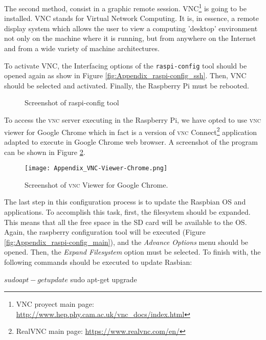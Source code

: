 The second method, consist in a graphic remote session. VNC\footnote{VNC proyect main page: \url{http://www.hep.phy.cam.ac.uk/vnc_docs/index.html}} is going to be installed. VNC stands for Virtual Network Computing. It is, in essence, a remote display system which allows the user to view a computing 'desktop' environment not only on the machine where it is running, but from anywhere on the Internet and from a wide variety of machine architectures. 

To activate VNC, the Interfacing options of the \texttt{raspi-config} tool should be opened again as show in Figure \ref{fig:Appendix_raspi-config_ssh}. Then, VNC should be selected and activated. Finally, the Raspberry Pi must be rebooted.

\begin{figure}[!h]
	\centering
	\caption{Screenshot of raspi-config tool}
	\label{fig:Appendix_raspi-config}
\end{figure}

To access the \textsc{vnc} server executing in the Raspberry Pi, we have opted to use \textsc{vnc} viewer for Google Chrome which in fact is a version of \textsc{vnc} Connect\footnote{RealVNC main page: \url{https://www.realvnc.com/en/}} application adapted to execute in Google Chrome web browser. A screenshot of the program can be shown in Figure \ref{fig:Appendix_VNC-Viewer-Chrome}.

\begin{figure}[!h]
	\begin{center}
		\texttt{[image: Appendix\_VNC-Viewer-Chrome.png]}
		\caption{Screenshot of \textsc{vnc} Viewer for Google Chrome.}
		\label{fig:Appendix_VNC-Viewer-Chrome}
	\end{center}
\end{figure}

The last step in this configuration process is to update the Raspbian \ac{OS} and applications. To accomplish this task, first, the filesystem should be expanded. This means that all the free space in the SD card will be available to the \ac{OS}. Again, the raspberry configuration tool will be executed (Figure \ref{fig:Appendix_raspi-config_main}), and the \emph{Advance Options} menu should be opened. Then, the \emph{Expand Filesystem} option must be selected. To finish with, the following commands should be executed to update Rasbian:
\begin{console}
$ sudo apt-get update
$ sudo apt-get upgrade
\end{console} %


